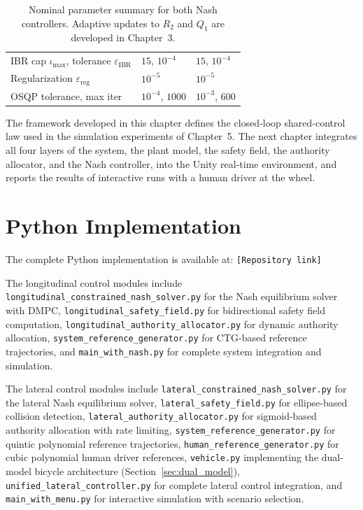 \documentclass[12pt,a4paper,oneside]{report}
\begin{document}
\begin{table}[H]
\begin{tabularx}{\textwidth}{|l|X|X|}
\hline
IBR cap $\iota_{\max}$, tolerance $\varepsilon_{\text{IBR}}$ & $15$, $10^{-4}$              & $15$, $10^{-4}$                        \\
Regularization $\varepsilon_{\text{reg}}$ & $10^{-5}$                                       & $10^{-5}$                              \\
OSQP tolerance, max iter                  & $10^{-4}$, $1000$                               & $10^{-3}$, $600$                       \\
\hline
\end{tabularx}
\caption{Nominal parameter summary for both Nash controllers. Adaptive updates to $R_2$ and $Q_1$ are developed in Chapter~3.}
\label{tab:all_parameters}
\end{table}

The framework developed in this chapter defines the closed-loop shared-control law used in the simulation experiments of Chapter~5. The next chapter integrates all four layers of the system, the plant model, the safety field, the authority allocator, and the Nash controller, into the Unity real-time environment, and reports the results of interactive runs with a human driver at the wheel.
\chapter{Python Implementation}

The complete Python implementation is available at: \texttt{[Repository link]}

The longitudinal control modules include \texttt{longitudinal\_constrained\_nash\_solver.py} for the Nash equilibrium solver with DMPC, \texttt{longitudinal\_safety\_field.py} for bidirectional safety field computation, \texttt{longitudinal\_authority\_allocator.py} for dynamic authority allocation, \texttt{system\_reference\_generator.py} for CTG-based reference trajectories, and \texttt{main\_with\_nash.py} for complete system integration and simulation.

The lateral control modules include \texttt{lateral\_constrained\_nash\_solver.py} for the lateral Nash equilibrium solver, \texttt{lateral\_safety\_field.py} for ellipse-based collision detection, \texttt{lateral\_authority\_allocator.py} for sigmoid-based authority allocation with rate limiting, \texttt{system\_reference\_generator.py} for quintic polynomial reference trajectories, \texttt{human\_reference\_generator.py} for cubic polynomial human driver references, \texttt{vehicle.py} implementing the dual-model bicycle architecture (Section~\ref{sec:dual_model}), \texttt{unified\_lateral\_controller.py} for complete lateral control integration, and \texttt{main\_with\_menu.py} for interactive simulation with scenario selection.


\printbibliography

\appendix
\end{document}
